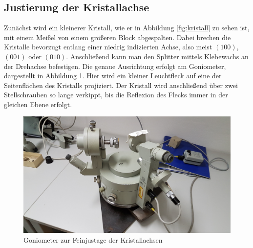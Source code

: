 
	\subsection{Justierung der Kristallachse} %
	\label{sub:justierung_der_kristallachse}

		Zunächst wird ein kleinerer Kristall, wie er in Abbildung \ref{fig:kristall} zu sehen ist, mit einem Meißel von einem größeren Block abgespalten.
		Dabei brechen die Kristalle bevorzugt entlang einer niedrig indizierten Achse, also meist $(100)$, $(001)$ oder $(010)$.
		Anschließend kann man den Splitter mittels Klebewachs an der Drehachse befestigen.
		Die genaue Ausrichtung erfolgt am Goniometer, dargestellt in Abbildung \ref{fig gonio}.
		Hier wird ein kleiner Leuchtfleck auf eine der Seitenflächen des Kristalls projiziert.
		Der Kristall wird anschließend über zwei Stellschrauben so lange verkippt, bis die Reflexion des Flecks immer in der gleichen Ebene erfolgt.

		\begin{figure}[htb]
			\centering
			\includegraphics[scale = 0.12]{images/goniometer.jpg}
			\caption{Goniometer zur Feinjustage der Kristallachsen}
			\label{fig gonio}
		\end{figure}


